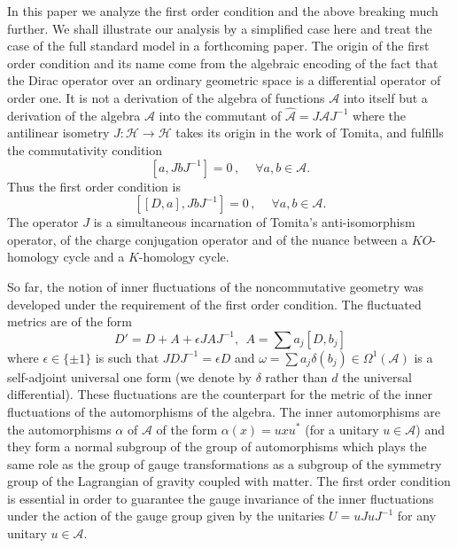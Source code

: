 \documentclass[preprint]{revtex4}
\begin{document}
In this paper we analyze the first order condition and the above breaking much further. 
We shall illustrate our analysis by a simplified case here and treat the case of the full standard model in a forthcoming paper. 
The origin of the first order condition and its name come from the algebraic encoding of the fact that the Dirac operator over an ordinary geometric space is a differential operator of order one. It is not a derivation of the algebra of functions ${\mathcal{A}}$ into itself but a derivation of the algebra ${\mathcal{A}}$ into the commutant of $\hat {\mathcal{A}}=J{\mathcal{A}} J^{-1}$ where the antilinear isometry $J:{\mathcal{H}}\to {\mathcal{H}}$ takes its origin in the work of Tomita, and fulfills the commutativity condition
\begin{equation}\label{com}
[a,Jb J^{-1}]=0 {\,,\quad~\forall} a,b \in {\mathcal{A}}.
\end{equation}
Thus the first order condition is
\begin{equation}\label{first}
    [[D,a],Jb J^{-1}]=0 {\,,\quad~\forall} a,b \in {\mathcal{A}}.
\end{equation}
The operator $J$ is a simultaneous incarnation of Tomita's anti-isomorphism operator, of the charge conjugation operator and of the nuance between a $KO$-homology cycle and a $K$-homology cycle.

So far, the notion of inner fluctuations of the noncommutative geometry was developed under the
requirement of the first order condition. The fluctuated  metrics are of the form
\begin{equation}\label{innerfluc}
D'=D+A+\epsilon JAJ^{-1}, \ \ A=\sum a_j[D,b_j]
\end{equation}
where $\epsilon\in\{ \pm 1\}$ is such that $JDJ^{-1} =\epsilon D$ and $\omega=\sum a_j\delta(b_j)\in \Omega^1({\mathcal{A}})$ is a self-adjoint universal one form (we denote by $\delta$ rather than $d$ the universal differential). These fluctuations are the counterpart for the metric of the inner fluctuations of the automorphisms of the algebra. The inner automorphisms are the automorphisms $\alpha$ of ${\mathcal{A}}$ of the form $\alpha(x)=uxu^*$ (for a unitary $u\in {\mathcal{A}}$) and they form a normal subgroup of the group of automorphisms which plays the same role as the group of gauge transformations as a subgroup of the symmetry group of the Lagrangian of gravity coupled with matter. The first order condition
is essential in order to guarantee the gauge invariance of the inner fluctuations under the action of the gauge group given by the unitaries $U=uJuJ^{-1}$ for any unitary $u\in {\mathcal{A}}$.
\end{document}
